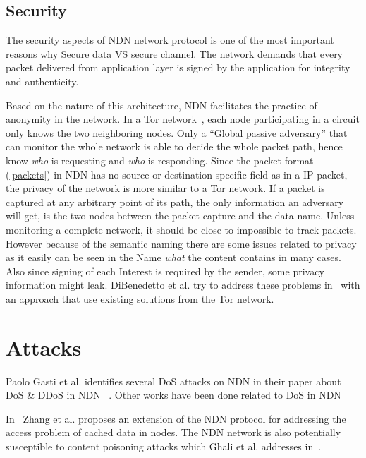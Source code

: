 \subsection{Security}
The security aspects of \gls{NDN} network protocol is one of the most important reasons why 
Secure data VS secure channel.
The network demands that every packet delivered from application layer is signed by the application for integrity and authenticity.

Based on the nature of this architecture, \gls{NDN} facilitates the practice of anonymity in the network. 
In a Tor network~\cite{DBLP:conf/uss/DingledineMS04}, each node participating in a circuit only knows the two neighboring nodes.
Only a ``Global passive adversary'' that can monitor the whole network is able to decide the whole packet path, hence know \textit{who} is requesting and \textit{who} is responding.
Since the packet format (\autoref{packets}) in \gls{NDN} has no source or destination specific field as in a \gls{IP} packet, the privacy of the network is more similar to a Tor network.
If a packet is captured at any arbitrary point of its path, the only information an adversary will get, is the two nodes between the packet capture and the data name. Unless monitoring a complete network, it should be close to impossible to track packets.  
However because of the semantic naming there are some issues related to privacy as it easily can be seen in the Name \textit{what} the content contains in many cases.
Also since signing of each Interest is required by the sender, some privacy information might leak.
DiBenedetto et al. try to address these problems in~\cite{DBLP:conf/ndss/DiBenedettoGTU12} with an approach that use existing solutions from the Tor network.

\section{Attacks}

Paolo Gasti et al. identifies several \gls{DoS} attacks on \gls{NDN} in their paper about \gls{DoS} \& \gls{DDoS} in \gls{NDN} ~\cite{DBLP:conf/icccn/GastiTU013}. Other works have been done related to \gls{DoS} in \gls{NDN}~\cite{DBLP:journals/ijcomsys/WangCZQZ14, DBLP:conf/ancs/SoNO13, DBLP:journals/corr/abs-1303-4823}

In~\cite{DBLP:journals/tifs/LiZZSF15} Zhang et al. proposes an extension of the \gls{NDN} protocol for addressing the access problem of cached data in nodes.  
The \gls{NDN} network is also potentially susceptible to content poisoning attacks which Ghali et al. addresses in~\cite{DBLP:journals/ccr/GhaliTU14}.

